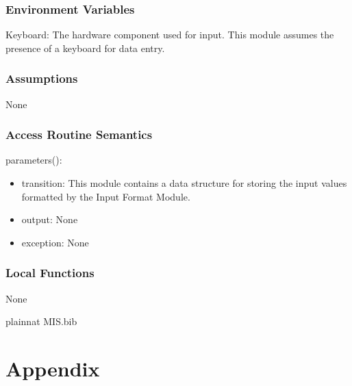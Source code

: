 \documentclass[12pt, titlepage]{article}
\begin{document}
\subsubsection{Environment Variables}
Keyboard: The hardware component used for input. This module assumes the presence of a keyboard for data entry.

\subsubsection{Assumptions}

None

\subsubsection{Access Routine Semantics}

parameters():
\begin{itemize}
\item transition: This module contains a data structure for storing the input values formatted by the Input Format Module.
\item output: None
\item exception: None
\end{itemize}

\subsubsection{Local Functions}
None
\newpage

 {plainnat}
 {MIS.bib}

\newpage

\section{Appendix} \label{Appendix}
\end{document}
